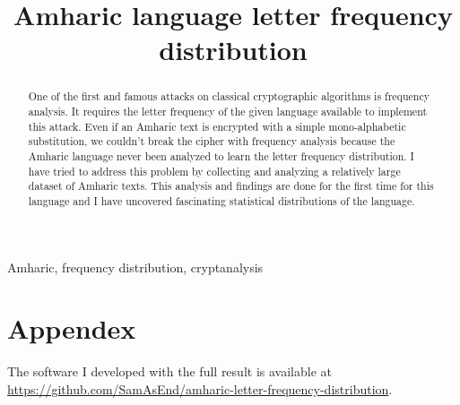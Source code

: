 \documentclass[conference]{IEEEtran}
\begin{document}
\title{Amharic language letter frequency distribution\\}
\author{
}

\maketitle

\begin{abstract}
One of the first and famous attacks on classical cryptographic algorithms is frequency analysis. It requires the letter frequency of the given language available to implement this attack. Even if an Amharic text is encrypted with a simple mono-alphabetic substitution, we couldn't break the cipher with frequency analysis because the Amharic language never been analyzed to learn the letter frequency distribution. I have tried to address this problem by collecting and analyzing a relatively large dataset of Amharic texts. This analysis and findings are done for the first time for this language and I have uncovered fascinating statistical distributions of the language.
\end{abstract}

\begin{IEEEkeywords}
Amharic, frequency distribution, cryptanalysis  
\end{IEEEkeywords}











\section{Appendex}
The software I developed with the full result is available at \url{https://github.com/SamAsEnd/amharic-letter-frequency-distribution}.

\printbibliography
\end{document}
